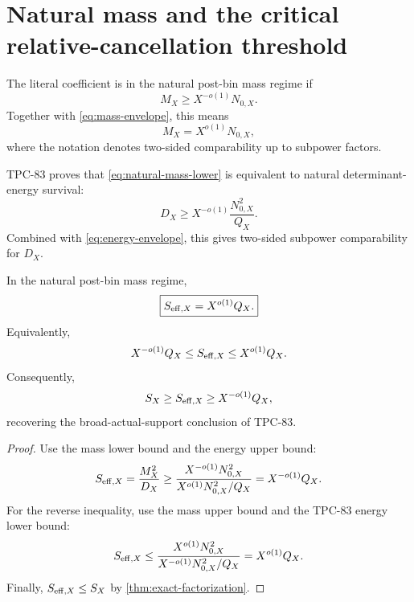 \section{Natural mass and the critical relative-cancellation threshold}
\label{sec:natural-mass-threshold}

\begin{definition}
\label{def:natural-mass-regime}
The literal coefficient is in the natural post-bin mass regime if
\begin{equation}
 M_X\ge X^{-o(1)}N_{0,X}.
\label{eq:natural-mass-lower}
\end{equation}
Together with \eqref{eq:mass-envelope}, this means
\[
 M_X=X^{o(1)}N_{0,X},
\]
where the notation denotes two-sided comparability up to subpower
factors.
\end{definition}

TPC-83 proves that \eqref{eq:natural-mass-lower} is equivalent to
natural determinant-energy survival:
\begin{equation}
 D_X\ge
 X^{-o(1)}\frac{N_{0,X}^2}{Q_X}.
\label{eq:natural-energy-lower}
\end{equation}
Combined with \eqref{eq:energy-envelope}, this gives two-sided
subpower comparability for \(D_X\).

\begin{theorem}
\label{thm:natural-effective-support}
In the natural post-bin mass regime,
\begin{equation}
 \boxed{
 S_{\mathrm{eff},X}=X^{o(1)}Q_X.}
\label{eq:natural-effective-support}
\end{equation}
Equivalently,
\[
 X^{-o(1)}Q_X\le S_{\mathrm{eff},X}\le X^{o(1)}Q_X.
\]
Consequently,
\begin{equation}
 S_X\ge S_{\mathrm{eff},X}\ge X^{-o(1)}Q_X,
\label{eq:broad-actual-support}
\end{equation}
recovering the broad-actual-support conclusion of TPC-83.
\end{theorem}

\begin{proof}
Use the mass lower bound and the energy upper bound:
\[
 S_{\mathrm{eff},X}=\frac{M_X^2}{D_X}
 \ge
 \frac{
 X^{-o(1)}N_{0,X}^2
 }{
 X^{o(1)}N_{0,X}^2/Q_X
 }
 =
 X^{-o(1)}Q_X.
\]
For the reverse inequality, use the mass upper bound and the
TPC-83 energy lower bound:
\[
 S_{\mathrm{eff},X}
 \le
 \frac{
 X^{o(1)}N_{0,X}^2
 }{
 X^{-o(1)}N_{0,X}^2/Q_X
 }
 =
 X^{o(1)}Q_X.
\]
Finally, \(S_{\mathrm{eff},X}\le S_X\) by
\cref{thm:exact-factorization}.
\end{proof}

